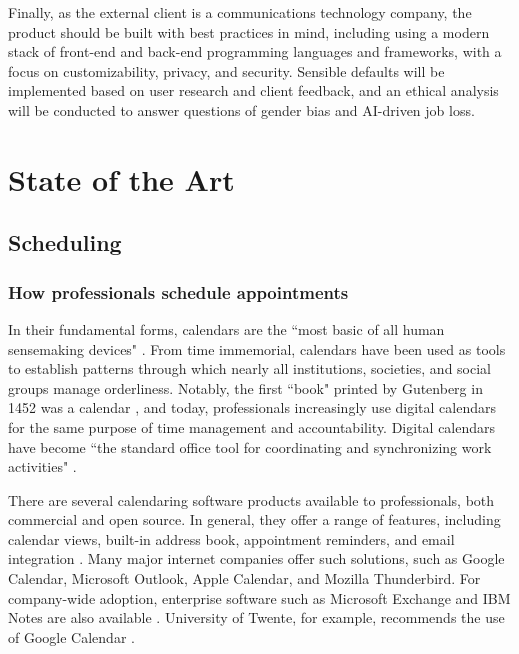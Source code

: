 \documentclass{article}
\begin{document}
Finally, as the external client is a communications technology company, the product should be built with best practices in mind, including using a modern stack of front-end and back-end programming languages and frameworks, with a focus on customizability, privacy, and security. Sensible defaults will be implemented based on user research and client feedback, and an ethical analysis will be conducted to answer questions of gender bias and AI-driven job loss.

\newpage

\section{State of the Art}

\subsection{Scheduling}

\subsubsection{How professionals schedule appointments}

In their fundamental forms, calendars are the ``most basic of all human sensemaking devices" \cite{wajcman_digital_2019}. From time immemorial, calendars have been used as tools to establish patterns through which nearly all institutions, societies, and social groups manage orderliness. Notably, the first ``book" printed by Gutenberg in 1452 was a calendar \cite{editors_printing_nodate}, and today, professionals increasingly use digital calendars for the same purpose of time management and accountability. Digital calendars have become ``the standard office tool for coordinating and synchronizing work activities" \cite{wajcman_digital_2019}.

There are several calendaring software products available to professionals, both commercial and open source. In general, they offer a range of features, including calendar views, built-in address book, appointment reminders, and email integration \cite{noauthor_top_2019}. Many major internet companies offer such solutions, such as Google Calendar, Microsoft Outlook, Apple Calendar, and Mozilla Thunderbird. For company-wide adoption, enterprise software such as Microsoft Exchange and IBM Notes are also available \cite{masli_design_2011}. University of Twente, for example, recommends the use of Google Calendar \cite{noauthor_home_nodate}.
\end{document}
